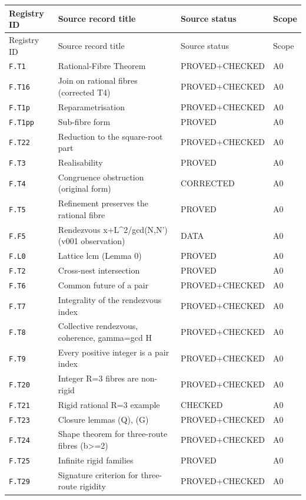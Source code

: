 \documentclass[11pt,oneside,openany]{book}
\theoremstyle{definition}
\theoremstyle{remark}
\begin{document}
\footnotesize
\begin{longtable}{@{}p{16mm}p{59mm}p{38mm}p{13mm}@{}}
\toprule
Registry ID & Source record title & Source status & Scope\\\midrule
\endfirsthead
\toprule Registry ID & Source record title & Source status & Scope\\\midrule
\endhead
\texttt{F.T1} & Rational-Fibre Theorem & PROVED+CHECKED & A0 \\
\texttt{F.T16} & Join on rational fibres (corrected T4) & PROVED+CHECKED & A0 \\
\texttt{F.T1p} & Reparametrisation & PROVED+CHECKED & A0 \\
\texttt{F.T1pp} & Sub-fibre form & PROVED & A0 \\
\texttt{F.T22} & Reduction to the square-root part & PROVED+CHECKED & A0 \\
\texttt{F.T3} & Realisability & PROVED & A0 \\
\texttt{F.T4} & Congruence obstruction (original form) & CORRECTED & A0 \\
\texttt{F.T5} & Refinement preserves the rational fibre & PROVED & A0 \\
\texttt{F.F5} & Rendezvous x+L\textasciicircum{}2/gcd(N,N') (v001 observation) & DATA & A0 \\
\texttt{F.L0} & Lattice lcm (Lemma 0) & PROVED & A0 \\
\texttt{F.T2} & Cross-nest intersection & PROVED & A0 \\
\texttt{F.T6} & Common future of a pair & PROVED+CHECKED & A0 \\
\texttt{F.T7} & Integrality of the rendezvous index & PROVED+CHECKED & A0 \\
\texttt{F.T8} & Collective rendezvous, coherence, gamma=gcd H & PROVED+CHECKED & A0 \\
\texttt{F.T9} & Every positive integer is a pair index & PROVED+CHECKED & A0 \\
\texttt{F.T20} & Integer R=3 fibres are non-rigid & PROVED+CHECKED & A0 \\
\texttt{F.T21} & Rigid rational R=3 example & CHECKED & A0 \\
\texttt{F.T23} & Closure lemmas (Q), (G) & PROVED+CHECKED & A0 \\
\texttt{F.T24} & Shape theorem for three-route fibres (b>=2) & PROVED+CHECKED & A0 \\
\texttt{F.T25} & Infinite rigid families & PROVED & A0 \\
\texttt{F.T29} & Signature criterion for three-route rigidity & PROVED+CHECKED & A0 \\

\end{longtable}
\end{document}
